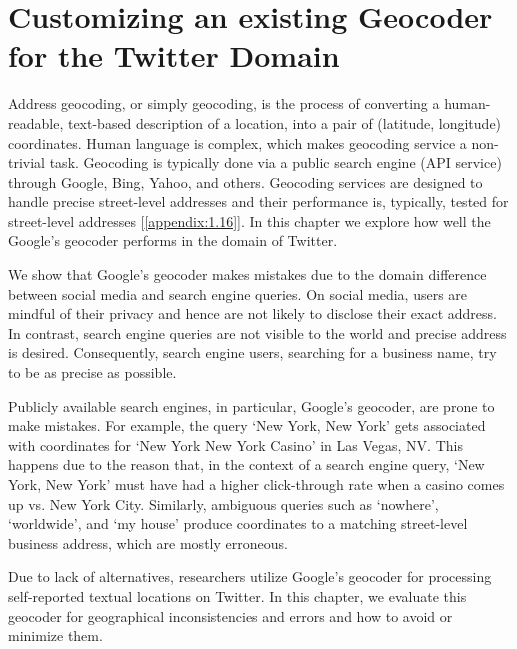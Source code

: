 \chapter{Customizing an existing Geocoder for the Twitter Domain}\label{chap2}

\setlength{\abovedisplayskip}{0pt} \setlength{\abovedisplayshortskip}{0pt}

Address geocoding, or simply geocoding, is the process of converting a human-readable, text-based description of a location, into a pair of (latitude, longitude) coordinates. Human language is complex, which makes geocoding service a non-trivial task. Geocoding is typically done via a public search engine (API service) through Google, Bing, Yahoo, and others. Geocoding services are designed to handle precise street-level addresses and their performance is, typically, tested for street-level addresses [\ref{appendix:1.16}]. In this chapter we explore how well the Google's geocoder performs in the domain of Twitter. 

We show that Google's geocoder makes mistakes due to the domain difference between social media and search engine queries. On social media, users are mindful of their privacy and hence are not likely to disclose their exact address. In contrast, search engine queries are not visible to the world and precise address is desired. Consequently, search engine users, searching  for a business name,  try to be as precise as possible. 

Publicly available search engines, in particular, Google's geocoder, are prone to make mistakes. For example, the query `New York, New York' gets associated with coordinates for `New York New York Casino' in Las Vegas, NV. This happens due to the reason that, in the context of a search engine query, `New York, New York' must have had a higher click-through rate when a casino comes up vs. New York City. Similarly, ambiguous queries such as `nowhere', `worldwide', and `my house'  produce coordinates to a matching street-level business address, which are mostly erroneous. 

Due to lack of alternatives, researchers utilize Google's geocoder for processing self-reported textual locations on Twitter. In this chapter, we evaluate this geocoder for geographical inconsistencies and errors and how to avoid or minimize them.

